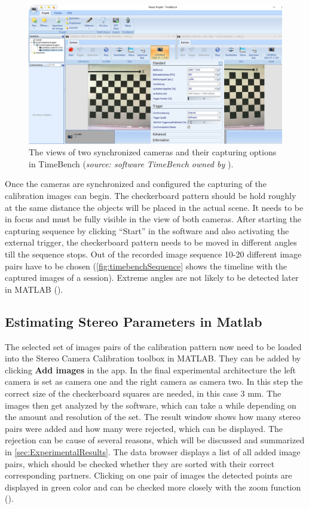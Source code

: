 \begin{figure}[htbp]
		\centering
		\includegraphics[width=1.0\textwidth]{figures/timebenchRecord}
		\caption[The views of two synchronized cameras and their capturing options in TimeBench]{The views of two synchronized cameras and their capturing options in TimeBench (\textit{source: software TimeBench owned by} \cite{Optronis.2016}).}
		\label{fig:timebanchRecord}
\end{figure}

Once the cameras are synchronized and configured the capturing of the calibration images can begin. The checkerboard pattern should be hold roughly at the same distance the objects will be placed in the actual scene. It needs to be in focus and must be fully visible in the view of both cameras. After starting the capturing sequence by clicking \enquote{Start} in the software and also activating the external trigger, the checkerboard pattern needs to be moved in different angles till the sequence stops. Out of the recorded image sequence 10-20 different image pairs have to be chosen (\autoref{fig:timebenchSequence} shows the timeline with the captured images of a session). Extreme angles are not likely to be detected later in MATLAB (\cite{StereoCalib.2016}).

\subsection{Estimating Stereo Parameters in Matlab}\label{ssec:estimateStereoParams}
The selected set of images pairs of the calibration pattern now need to be loaded into the Stereo Camera Calibration toolbox in MATLAB. They can be added by clicking \textbf{Add images} in the app. In the final experimental architecture the left camera is set as camera one and the right camera as camera two. In this step the correct size of the checkerboard squares are needed, in this case 3 mm. The images then get analyzed by the software, which can take a while depending on the amount and resolution of the set. The result window shows how many stereo pairs were added and how many were rejected, which can be displayed. The rejection can be cause of several reasons, which will be discussed and summarized in \autoref{sec:ExperimentalResults}. The data browser displays a list of all added image pairs, which should be checked whether they are sorted with their correct corresponding partners. Clicking on one pair of images the detected points are displayed in green color and can be checked more closely with the zoom function (\cite{StereoCalib.2016}).

